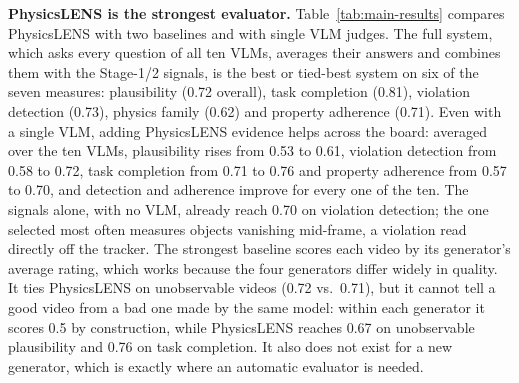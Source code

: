 \textbf{PhysicsLENS is the strongest evaluator.} Table~\ref{tab:main-results} compares PhysicsLENS with two baselines and with single VLM judges. The full system, which asks every question of all ten VLMs, averages their answers and combines them with the Stage-1/2 signals, is the best or tied-best system on six of the seven measures: plausibility (0.72 overall), task completion (0.81), violation detection (0.73), physics family (0.62) and property adherence (0.71). Even with a single VLM, adding PhysicsLENS evidence helps across the board: averaged over the ten VLMs, plausibility rises from 0.53 to 0.61, violation detection from 0.58 to 0.72, task completion from 0.71 to 0.76 and property adherence from 0.57 to 0.70, and detection and adherence improve for every one of the ten. The signals alone, with no VLM, already reach 0.70 on violation detection; the one selected most often measures objects vanishing mid-frame, a violation read directly off the tracker. The strongest baseline scores each video by its generator's average rating, which works because the four generators differ widely in quality. It ties PhysicsLENS on unobservable videos (0.72 vs.\ 0.71), but it cannot tell a good video from a bad one made by the same model: within each generator it scores 0.5 by construction, while PhysicsLENS reaches 0.67 on unobservable plausibility and 0.76 on task completion. It also does not exist for a new generator, which is exactly where an automatic evaluator is needed.

